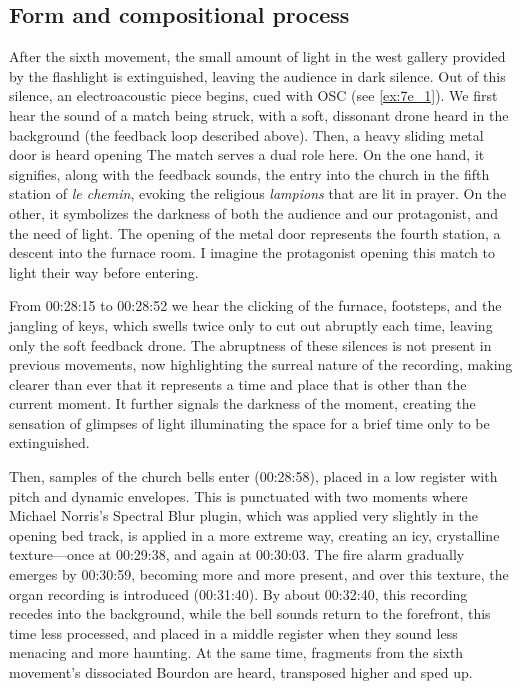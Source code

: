 \documentclass[12pt,twoside,maitrise]{dms_ks}
\theoremstyle{definition}
\begin{document}
{\subsection{Form and compositional process}

After the sixth movement, the small amount of light in the west gallery provided by the flashlight is extinguished, leaving the audience in dark silence. 
Out of this silence, an electroacoustic piece begins, cued with OSC (see \cref{ex:7e_1}). 
We first hear the sound of a match being struck, with a soft, dissonant drone heard in the background (the feedback loop described above). 
Then, a heavy sliding metal door is heard opening
The match serves a dual role here.
On the one hand, it signifies, along with the feedback sounds, the entry into the church in the fifth station of \textit{le chemin}, evoking the religious \textit{lampions} that are lit in prayer.
On the other, it symbolizes the darkness of both the audience and our protagonist, and the need of light.
The opening of the metal door represents the fourth station, a descent into the furnace room.
I imagine the protagonist opening this match to light their way before entering.

From 00:28:15 to 00:28:52 we hear the clicking of the furnace, footsteps, and the jangling of keys, which swells twice only to cut out abruptly each time, leaving only the soft feedback drone. 
The abruptness of these silences is not present in previous movements, now highlighting the surreal nature of the recording, making clearer than ever that it represents a time and place that is other than the current moment. 
It further signals the darkness of the moment, creating the sensation of glimpses of light illuminating the space for a brief time only to be extinguished. 

Then, samples of the church bells enter (00:28:58), placed in a low register with pitch and dynamic envelopes. 
This is punctuated with two moments where Michael Norris's Spectral Blur plugin, which was applied very slightly in the opening bed track, is applied in a more extreme way, creating an icy, crystalline texture---once at 00:29:38, and again at 00:30:03. 
The fire alarm gradually emerges by 00:30:59, becoming more and more present, and over this texture, the organ recording is introduced (00:31:40). 
By about 00:32:40, this recording recedes into the background, while the bell sounds return to the forefront, this time less processed, and placed in a middle register when they sound less menacing and more haunting. 
At the same time, fragments from the sixth movement's dissociated Bourdon are heard, transposed higher and sped up.

}
\end{document}
